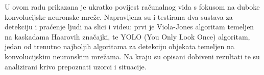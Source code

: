 U ovom radu prikazana je ukratko povijest računalnog vida s fokusom na duboke konvolucijske neuronske mreže. Napravljena su i testirana dva sustava za detekciju i praćenje ljudi na slici i videu: prvi je Viola-Jones algoritam temeljen na kaskadama Haarovih značajki, te YOLO (You Only Look Once) algoritam, jedan od trenutno najboljih algoritama za detekciju objekata temeljen na konvolucijskim neuronskim mrežama. Na kraju su opisani dobiveni rezultati te su analizirani krivo prepoznati uzorci i situacije.